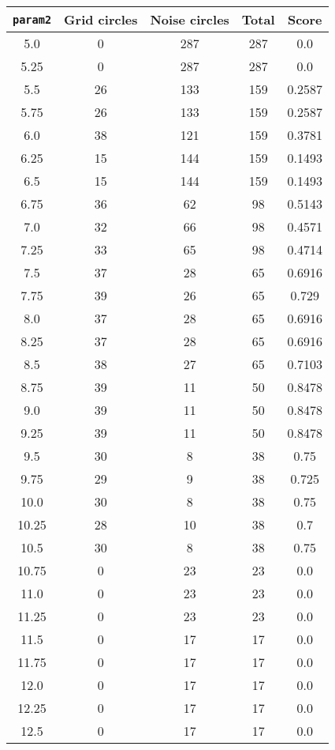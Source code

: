 \documentclass[letterpaper, 12pt]{article}
\begin{document}
\begin{longtable}{|c|c|c|c|c|}
\hline
\textbf{\texttt{param2}} & \textbf{Grid circles} & \textbf{Noise circles} & \textbf{Total} & \textbf{Score} \\
\hline
5.0 & 0 & 287 & 287 & 0.0 \\
\hline
5.25 & 0 & 287 & 287 & 0.0 \\
\hline
5.5 & 26 & 133 & 159 & 0.2587 \\
\hline
5.75 & 26 & 133 & 159 & 0.2587 \\
\hline
6.0 & 38 & 121 & 159 & 0.3781 \\
\hline
6.25 & 15 & 144 & 159 & 0.1493 \\
\hline
6.5 & 15 & 144 & 159 & 0.1493 \\
\hline
6.75 & 36 & 62 & 98 & 0.5143 \\
\hline
7.0 & 32 & 66 & 98 & 0.4571 \\
\hline
7.25 & 33 & 65 & 98 & 0.4714 \\
\hline
7.5 & 37 & 28 & 65 & 0.6916 \\
\hline
7.75 & 39 & 26 & 65 & 0.729 \\
\hline
8.0 & 37 & 28 & 65 & 0.6916 \\
\hline
8.25 & 37 & 28 & 65 & 0.6916 \\
\hline
8.5 & 38 & 27 & 65 & 0.7103 \\
\hline
8.75 & 39 & 11 & 50 & 0.8478 \\
\hline
9.0 & 39 & 11 & 50 & 0.8478 \\
\hline
9.25 & 39 & 11 & 50 & 0.8478 \\
\hline
9.5 & 30 & 8 & 38 & 0.75 \\
\hline
9.75 & 29 & 9 & 38 & 0.725 \\
\hline
10.0 & 30 & 8 & 38 & 0.75 \\
\hline
10.25 & 28 & 10 & 38 & 0.7 \\
\hline
10.5 & 30 & 8 & 38 & 0.75 \\
\hline
10.75 & 0 & 23 & 23 & 0.0 \\
\hline
11.0 & 0 & 23 & 23 & 0.0 \\
\hline
11.25 & 0 & 23 & 23 & 0.0 \\
\hline
11.5 & 0 & 17 & 17 & 0.0 \\
\hline
11.75 & 0 & 17 & 17 & 0.0 \\
\hline
12.0 & 0 & 17 & 17 & 0.0 \\
\hline
12.25 & 0 & 17 & 17 & 0.0 \\
\hline
12.5 & 0 & 17 & 17 & 0.0 \\

\end{longtable}
\end{document}
